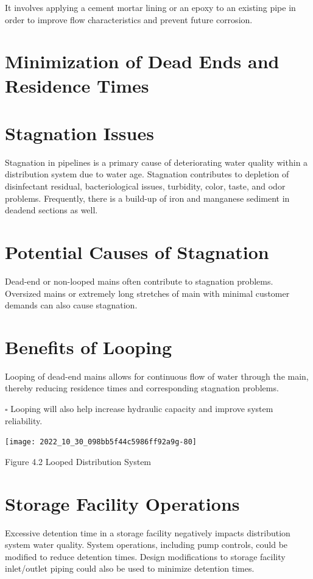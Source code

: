 \documentclass[10pt]{article}
\begin{document}
It involves applying a cement mortar lining or an epoxy to an existing pipe in order to improve flow characteristics and prevent future corrosion.

\section{Minimization of Dead Ends and Residence Times}
\section{Stagnation Issues}
Stagnation in pipelines is a primary cause of deteriorating water quality within a distribution system due to water age. Stagnation contributes to depletion of disinfectant residual, bacteriological issues, turbidity, color, taste, and odor problems. Frequently, there is a build-up of iron and manganese sediment in deadend sections as well.

\section{Potential Causes of Stagnation}
Dead-end or non-looped mains often contribute to stagnation problems. Oversized mains or extremely long stretches of main with minimal customer demands can also cause stagnation.

\section{Benefits of Looping}
Looping of dead-end mains allows for continuous flow of water through the main, thereby reducing residence times and corresponding stagnation problems.

$\square$ Looping will also help increase hydraulic capacity and improve system reliability.

\texttt{[image: 2022\_10\_30\_098bb5f44c5986ff92a9g-80]}

Figure 4.2 Looped Distribution System

\section{Storage Facility Operations}
Excessive detention time in a storage facility negatively impacts distribution system water quality. System operations, including pump controls, could be modified to reduce detention times. Design modifications to storage facility inlet/outlet piping could also be used to minimize detention times.
\end{document}

